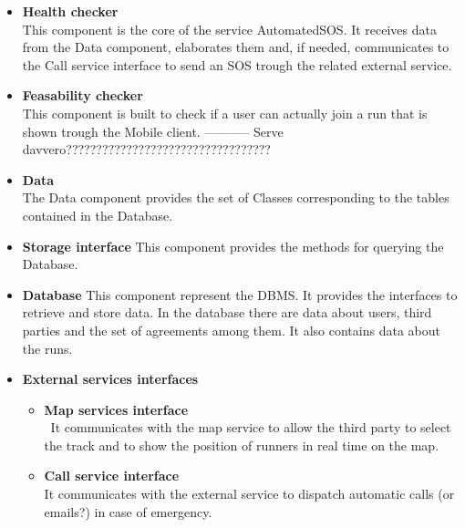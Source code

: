 \begin{legal}
\begin{itemize}
{				}\\
		\item{\textbf{Health checker}\\
		This component is the core of the service AutomatedSOS. It receives data from the Data component, elaborates them and, if needed, communicates to the Call service interface to send an SOS trough the related external service.
				}\\
		\item{\textbf{Feasability checker}\\
		This component is built to check if a user can actually join a run that is shown trough the Mobile client.
		----------- Serve davvero??????????????????????????????????
				}\\
		\item{\textbf{Data}\\
		The Data component provides the set of Classes corresponding to the tables contained in the Database.
				}\\
		\item{\textbf{Storage interface}
		This component provides the methods for querying the Database.
				}\\
		\item{\textbf{Database}
		This component represent the DBMS. It provides the interfaces to retrieve and store data. In the database there are data about users, third parties and the set of agreements among them. It also contains data about the runs.
				}\\
		\item{\textbf{External services interfaces}\\
      	\begin{itemize}
      	\item{\textbf{Map services interface}\\\
      	It communicates with the map service to allow the third party to select the track and to show the position of runners in real time on the map.
					}\\
			\item{\textbf{Call service interface}\\
			It communicates with the external service to dispatch automatic calls (or emails?) in case of emergency.
					}\\
      	\end{itemize}
				}
		\end{itemize}


\end{legal}
